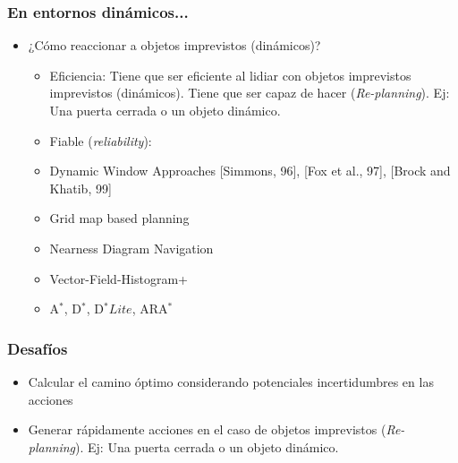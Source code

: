 \begin{frame}
    \frametitle{En entornos dinámicos...}
    
    \begin{itemize}
        \item ¿Cómo reaccionar a objetos imprevistos (dinámicos)?
        \begin{itemize}
            \item Eficiencia: Tiene que ser eficiente al lidiar con objetos imprevistos imprevistos (dinámicos). Tiene que ser capaz de hacer (\emph{Re-planning}). Ej: Una puerta cerrada o un objeto dinámico.
            \item Fiable (\emph{reliability}):
        \end{itemize}
        
        \begin{itemize}
            \item Dynamic Window Approaches
            [Simmons, 96], [Fox et al., 97], [Brock and Khatib, 99]
            \item Grid map based planning
            \item Nearness Diagram Navigation
            \item Vector-Field-Histogram+
            \item A$^{*}$, D$^{*}$, D$^{*} Lite$, ARA$^{*}$
        \end{itemize}
        
    \end{itemize}
    
\end{frame}

\begin{frame}
	\frametitle{Desafíos}
	
	\begin{itemize}
		\item Calcular el camino óptimo considerando potenciales incertidumbres en las acciones
		\item Generar rápidamente acciones en el caso de objetos imprevistos (\emph{Re-planning}). Ej: Una puerta cerrada o un objeto dinámico.
	\end{itemize}
	
\end{frame}


